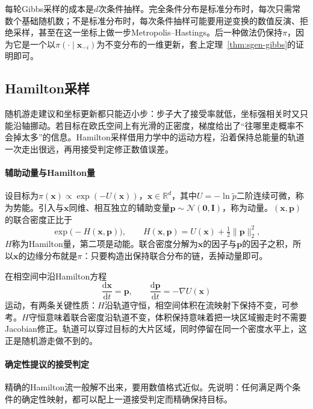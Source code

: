 每轮Gibbs采样的成本是$d$次条件抽样。完全条件分布是标准分布时，每次只需常数个基础随机数；不是标准分布时，每次条件抽样可能要用逆变换的数值反演、拒绝采样，甚至在这一坐标上做一步Metropolis--Hastings。后一种做法仍保持$\pi$，因为它是一个以$\pi(\cdot\mid\bm{x}_{-i})$为不变分布的一维更新，套上定理~\ref{thm:sgen-gibbs}的证明即可。

\subsection{Hamilton采样}
\label{sec:sgen-hmc}

随机游走建议和坐标更新都只能迈小步：步子大了接受率就低，坐标强相关时又只能沿轴挪动。若目标在欧氏空间上有光滑的正密度，梯度给出了“往哪里走概率不会掉太多”的信息。Hamilton采样借用力学中的运动方程，沿着保持总能量的轨道一次走出很远，再用接受判定修正数值误差。

\paragraph{辅助动量与Hamilton量}
设目标为$\pi(\bm{x})\propto\exp(-U(\bm{x}))$，$\bm{x}\in\mathbb{R}^{d}$，其中$U=-\ln\widetilde{p}$二阶连续可微，称为势能。引入与$\bm{x}$同维、相互独立的辅助变量$\bm{p}\sim\mathcal{N}(\bm{0},\bm{I})$，称为动量。$(\bm{x},\bm{p})$的联合密度正比于
\begin{equation}
  \exp\bigl(-H(\bm{x},\bm{p})\bigr),\qquad H(\bm{x},\bm{p})=U(\bm{x})+\tfrac12\lVert\bm{p}\rVert_2^{2},
  \label{eq:sgen-hamiltonian}
\end{equation}
$H$称为Hamilton量，第二项是动能。联合密度分解为$\bm{x}$的因子与$\bm{p}$的因子之积，所以$\bm{x}$的边缘分布就是$\pi$：只要构造出保持联合分布的链，丢掉动量即可。

在相空间中沿Hamilton方程
\[
  \frac{\mathrm{d}\bm{x}}{\mathrm{d}t}=\bm{p},\qquad \frac{\mathrm{d}\bm{p}}{\mathrm{d}t}=-\nabla U(\bm{x})
\]
运动，有两条关键性质：$H$沿轨道守恒，相空间体积在流映射下保持不变，可参考。$H$守恒意味着联合密度沿轨道不变，体积保持意味着把一块区域搬走时不需要Jacobian修正。轨道可以穿过目标的大片区域，同时停留在同一个密度水平上，这正是随机游走做不到的。

\paragraph{确定性提议的接受判定}
精确的Hamilton流一般解不出来，要用数值格式近似。先说明：任何满足两个条件的确定性映射，都可以配上一道接受判定而精确保持目标。

